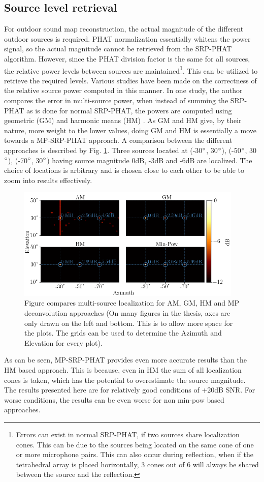 \subsection{Source level retrieval}\label{srcLvlRetrieval}
For outdoor sound map reconstruction, the actual magnitude of the different outdoor sources is required. PHAT normalization essentially whitens the power signal, so the actual magnitude cannot be retrieved from the SRP-PHAT algorithm. However, since the PHAT division factor is the same for all sources, the relative power levels between sources are maintained\footnote{Errors can exist in normal SRP-PHAT, if two sources share localization cones. This can be due to the sources being located on the same cone of one or more microphone pairs. This can also occur during reflection, when if the tetrahedral array is placed horizontally, 3 cones out of 6 will always be shared between the source and the reflection.}.  
This can be utilized to retrieve the required levels. Various studies have been made on the correctness of the relative source power computed in this manner. In one study, the author compares the error in multi-source power, when instead of summing the SRP-PHAT as is done for normal SRP-PHAT, the powers are computed using geometric (GM) and harmonic means (HM) \cite{padois2016use}. As GM and HM give, by their nature, more weight to the lower values, doing GM and HM is essentially a move towards a MP-SRP-PHAT approach. A comparison between the different approaches is described by Fig. \ref{fig:srcLevelComp}. Three sources located at (-30$\degree$, 30$\degree$), (-50$\degree$, 30$\degree$), (-70$\degree$, 30$\degree$) having source magnitude 0dB, -3dB and -6dB are localized. The choice of locations is arbitrary and is chosen close to each other to be able to zoom into results effectively.
\begin{figure}[!ht]
\centering
\includegraphics[width=0.96\textwidth]{Figures/srcLvlComp.png}
\caption{Figure compares multi-source localization for AM, GM, HM and MP deconvolution approaches (On many figures in the thesis, axes are only drawn on the left and bottom. This is to allow more space for the plots. The grids can be used to determine the Azimuth and Elevation for every plot).}
\label{fig:srcLevelComp}
\end{figure}
As can be seen, MP-SRP-PHAT provides even more accurate results than the HM based approach. This is because, even in HM the sum of all localization cones is taken, which has the potential to overestimate the source magnitude. The results presented here are for relatively good conditions of +20dB SNR. For worse conditions, the results can be even worse for non min-pow based approaches. 

